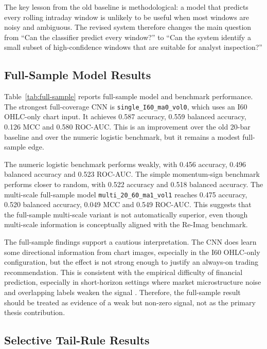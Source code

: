 The key lesson from the old baseline is methodological: a model that predicts every rolling intraday window is unlikely to be useful when most windows are noisy and ambiguous. The revised system therefore changes the main question from ``Can the classifier predict every window?'' to ``Can the system identify a small subset of high-confidence windows that are suitable for analyst inspection?''

\subsection{Full-Sample Model Results}
\label{subsec:full_sample_results}





Table~\ref{tab:full-sample} reports full-sample model and benchmark performance. The strongest full-coverage CNN is \texttt{single\_I60\_ma0\_vol0}, which uses an I60 OHLC-only chart input. It achieves 0.587 accuracy, 0.559 balanced accuracy, 0.126 MCC and 0.580 ROC-AUC. This is an improvement over the old 20-bar baseline and over the numeric logistic benchmark, but it remains a modest full-sample edge.

The numeric logistic benchmark performs weakly, with 0.456 accuracy, 0.496 balanced accuracy and 0.523 ROC-AUC. The simple momentum-sign benchmark performs closer to random, with 0.522 accuracy and 0.518 balanced accuracy. The multi-scale full-sample model \texttt{multi\_20\_60\_ma1\_vol1} reaches 0.475 accuracy, 0.520 balanced accuracy, 0.049 MCC and 0.549 ROC-AUC. This suggests that the full-sample multi-scale variant is not automatically superior, even though multi-scale information is conceptually aligned with the Re-Imag benchmark.

The full-sample findings support a cautious interpretation. The CNN does learn some directional information from chart images, especially in the I60 OHLC-only configuration, but the effect is not strong enough to justify an always-on trading recommendation. This is consistent with the empirical difficulty of financial prediction, especially in short-horizon settings where market microstructure noise and overlapping labels weaken the signal \cite{lopez_de_prado_afml,deeplob,sirignano_cont_universal}. Therefore, the full-sample result should be treated as evidence of a weak but non-zero signal, not as the primary thesis contribution.

\subsection{Selective Tail-Rule Results}
\label{subsec:tail_results}

